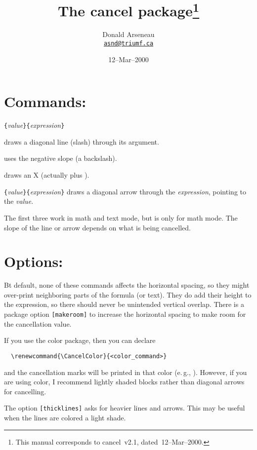\documentclass[pagesize=auto]{scrartcl}
\title{The \textsf{cancel} package\thanks{This manual corresponds to \textsf{cancel}~v2.1, dated~12--Mar--2000.}}
\author{Donald Arseneau\\\href{mailto:asnd@triumf.ca}{\texttt{asnd@triumf.ca}}}
\date{12--Mar--2000}
\newcommand*{\meta}[1]{\textlangle\textsl{#1}\textrangle}
\newcommand*{\marg}[1]{\texttt{\{}\meta{#1}\texttt{\}}}
\newcommand*{\cmd}[1]{\texttt{\string#1}}
\begin{document}
\maketitle

\section{Commands:}

\begin{labeling}{\cmd{\cancelto}\marg{value}\marg{expression}}
\item[\cmd{\cancel}] draws a diagonal line (slash) through its argument.
\item[\cmd{\bcancel}] uses the negative slope (a backslash).
\item[\cmd{\xcancel}] draws an X (actually \cmd{\cancel} plus \cmd{\bcancel}).
\item[\cmd{\cancelto}\marg{value}\marg{expression}] draws a diagonal arrow through the \meta{expression}, pointing to the \meta{value}.
\end{labeling}
%
The first three work in math and text mode, but \cmd{\cancelto} is only
for math mode.
The slope of the line or arrow depends on what is being cancelled.  


\section{Options:}

Bt default, none of these commands affects the horizontal spacing, 
so they might over-print neighboring parts of the formula (or text).
They do add their height to the expression, so there should never be 
unintended vertical overlap.  There is a package option \texttt{[makeroom]} to 
increase the horizontal spacing to make room for the cancellation value.  

If you use the color package, then you can declare
%
\begin{verbatim}
  \renewcommand{\CancelColor}{<color_command>}
\end{verbatim}
%
and the cancellation marks will be printed in that color (e.\,g., \cmd{\blue}).
However, if you are using color, I recommend lightly shaded blocks rather
than diagonal arrows for cancelling.

The option \texttt{[thicklines]} asks for heavier lines and arrows. This may be
useful when the lines are colored a light shade.
\end{document}

